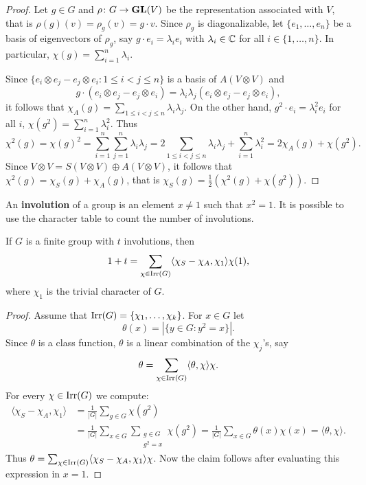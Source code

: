 \begin{proof}
    Let $g\in G$ and $\rho\colon G\to\mathbf{GL}(V)$ be the representation
    associated with $V$, that is $\rho(g)(v)=\rho_g(v)=g\cdot v$. 
    Since $\rho_g$ is diagonalizable, let $\{e_1,\dots,e_n\}$ 
    be a basis of eigenvectors of $\rho_g$, say
    $g\cdot e_i=\lambda_ie_i$ with $\lambda_i\in\mathbb{C}$ for all $i\in\{1,\dots,n\}$. In particular, $\chi(g)=\sum_{i=1}^n\lambda_i$. 
    
    Since $\{e_i\otimes e_j-e_j\otimes e_i:1\leq i<j\leq n\}$ is a basis of
    $A(V\otimes V)$ and 
    \[
    g\cdot (e_i\otimes e_j-e_j\otimes e_i)=\lambda_i\lambda_j(e_i\otimes e_j-e_j\otimes e_i),
    \]
    it follows that
    $\chi_A(g)=\sum_{1\leq i<j\leq n}\lambda_i\lambda_j$. On the other hand,
    $g^2\cdot e_i=\lambda_i^2e_i$ for all $i$,
    $\chi(g^2)=\sum_{i=1}^n\lambda_i^2$. Thus 
    \[
    \chi^2(g)=\chi(g)^2=\sum_{i=1}^n\sum_{j=1}^n\lambda_i\lambda_j=2\sum_{1\leq i<j\leq n}\lambda_i\lambda_j+\sum_{i=1}^n\lambda_i^2=2\chi_A(g)+\chi(g^2).
    \]
    Since $V\otimes V=S(V\otimes V)\oplus A(V\otimes V)$, it follows that  
    $\chi^2(g)=\chi_S(g)+\chi_A(g)$, that is 
    $\chi_S(g)=\frac12(\chi^2(g)+\chi(g^2))$.
\end{proof}

An \textbf{involution} of a group is an element $x\ne 1$ such that $x^2=1$. 
It is possible to use the character table to count the number
of involutions.

\begin{proposition}
    If $G$ is a finite group with $t$ involutions, then
    \[
        1+t=\sum_{\chi\in\operatorname{Irr}(G)}\langle\chi_S-\chi_A,\chi_1\rangle\chi(1),
    \]
    where $\chi_1$ is 
    the trivial character of $G$.
\end{proposition}

\begin{proof}
    Assume that $\operatorname{Irr}(G)=\{\chi_1,\dots,\chi_k\}$.  
    For $x\in G$ let 
    \[
    \theta(x)=|\{y\in G:y^2=x\}|.
    \]
    Since $\theta$ is a class function, 
    $\theta$ is a linear combination of the $\chi_j$'s, say 
    \[
    \theta=\sum_{\chi\in\operatorname{Irr}(G)}\langle\theta,\chi\rangle\chi.
    \]
    For every $\chi\in\operatorname{Irr}(G)$ we compute: 
    \begin{align*}
        \langle\chi_S-\chi_A,\chi_1\rangle 
        &=\frac{1}{|G|}\sum_{g\in G}\chi(g^2)\\
        &=\frac{1}{|G|}\sum_{x\in G}\sum_{\substack{g\in G\\g^2=x}}\chi(g^2)
        =\frac{1}{|G|}\sum_{x\in G}\theta(x)\chi(x)=\langle\theta,\chi\rangle.
    \end{align*}
    Thus $\theta=\sum_{\chi\in\operatorname{Irr}(G)}\langle\chi_S-\chi_A,\chi_1\rangle\chi$. Now
    the claim follows after evaluating this expression in 
    $x=1$. 
\end{proof}

